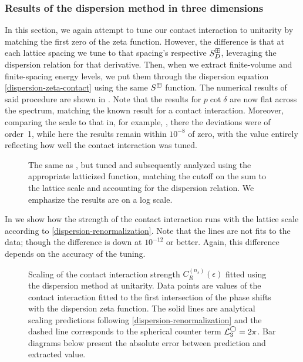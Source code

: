 \subsubsection{Results of the dispersion method in three dimensions}

In this section, we again attempt to tune our contact interaction to unitarity by matching the first zero of the \Luscher zeta function.
However, the difference is that at each lattice spacing we tune to that spacing's respective $S^{\boxplus}_D$, leveraging the dispersion relation for that derivative.
Then, when we extract finite-volume and finite-spacing energy levels, we put them through the dispersion equation \eqref{dispersion-zeta-contact} using the same $S^{\boxplus}$ function.
The numerical results of said procedure are shown in .
Note that the results for $p\cot\delta$ are now flat across the spectrum, matching the known result for a contact interaction.
Moreover, comparing the scale to that in, for example, , there the deviations were of order~1, while here the results remain within $10^{-8}$ of zero, with the value entirely reflecting how well the contact interaction was tuned.

\begin{figure}[htb]
    \scalebox{0.9}{}
    \caption{The same as , but tuned and subsequently analyzed using the appropriate latticized \Luscher function, matching the cutoff on the sum to the lattice scale and accounting for the dispersion relation.
    We emphasize the results are on a log scale.
    }
    \label{fig:unimproved dispersion}
\end{figure}

In  we show how the strength of the contact interaction runs with the lattice scale according to \eqref{dispersion-renormalization}.
Note that the lines are not fits to the data; though the difference is down at $10^{-12}$ or better.
Again, this difference depends on the accuracy of the tuning.

\begin{figure}
    \scalebox{0.8}{}
    \caption{
        Scaling of the contact interaction strength $C_R^{(n_s)}(\epsilon)$ fitted using the dispersion method at unitarity.
        Data points are values of the contact interaction fitted to the first intersection of the phase shifts with the dispersion zeta function.
        The solid lines are analytical scaling predictions following \eqref{dispersion-renormalization} and the dashed line corresponds to the spherical counter term $ \mathcal{L}^{\bigcirc}_3 = 2 \pi$.
        Bar diagrams below present the absolute error between prediction and extracted value.
    }
    \label{fig:dispersion running of strength}
\end{figure}

